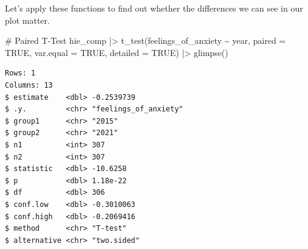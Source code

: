 \documentclass[
  letterpaper,
]{krantz}
\makeatletter
\newenvironment{Shaded}{\begin{snugshade}}{\end{snugshade}}
\newcommand{\AttributeTok}[1]{\textcolor[rgb]{0.40,0.45,0.13}{#1}}
\newcommand{\CommentTok}[1]{\textcolor[rgb]{0.37,0.37,0.37}{#1}}
\newcommand{\ConstantTok}[1]{\textcolor[rgb]{0.56,0.35,0.01}{#1}}
\newcommand{\FunctionTok}[1]{\textcolor[rgb]{0.28,0.35,0.67}{#1}}
\newcommand{\NormalTok}[1]{\textcolor[rgb]{0.00,0.23,0.31}{#1}}
\newcommand{\SpecialCharTok}[1]{\textcolor[rgb]{0.37,0.37,0.37}{#1}}
\newenvironment{kframe}{%
\medskip{}
\setlength{\fboxsep}{.8em}
 \def\at@end@of@kframe{}%
 \ifinner\ifhmode%
  \def\at@end@of@kframe{\end{minipage}}%
  \begin{minipage}{\columnwidth}%
 \fi\fi%
 \def\FrameCommand##1{\hskip\@totalleftmargin \hskip-\fboxsep
 \colorbox{shadecolor}{##1}\hskip-\fboxsep
     \hskip-\linewidth \hskip-\@totalleftmargin \hskip\columnwidth}%
 \MakeFramed {\advance\hsize-\width
   \@totalleftmargin\z@ \linewidth\hsize
   \@setminipage}}%
 {\par\unskip\endMakeFramed%
 \at@end@of@kframe}
\renewenvironment{Shaded}{\begin{kframe}}{\end{kframe}}
\makeatother
\begin{document}
\begin{table}

\caption{\label{tbl-comparing-two-groups-paired}Comparing two paired
groups}


\end{table}%

Let's apply these functions to find out whether the differences we can
see in our plot matter.

\begin{Shaded}
\begin{Highlighting}[]
\CommentTok{\# Paired T{-}Test}
\NormalTok{hie\_comp }\SpecialCharTok{|\textgreater{}}
  \FunctionTok{t\_test}\NormalTok{(feelings\_of\_anxiety }\SpecialCharTok{\textasciitilde{}}\NormalTok{ year,}
         \AttributeTok{paired =} \ConstantTok{TRUE}\NormalTok{,}
         \AttributeTok{var.equal =} \ConstantTok{TRUE}\NormalTok{,}
         \AttributeTok{detailed =} \ConstantTok{TRUE}\NormalTok{) }\SpecialCharTok{|\textgreater{}}
  \FunctionTok{glimpse}\NormalTok{()}
\end{Highlighting}
\end{Shaded}

\begin{verbatim}
Rows: 1
Columns: 13
$ estimate    <dbl> -0.2539739
$ .y.         <chr> "feelings_of_anxiety"
$ group1      <chr> "2015"
$ group2      <chr> "2021"
$ n1          <int> 307
$ n2          <int> 307
$ statistic   <dbl> -10.6258
$ p           <dbl> 1.18e-22
$ df          <dbl> 306
$ conf.low    <dbl> -0.3010063
$ conf.high   <dbl> -0.2069416
$ method      <chr> "T-test"
$ alternative <chr> "two.sided"
\end{verbatim}
\end{document}
